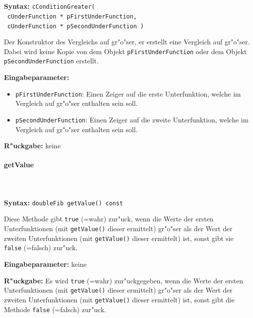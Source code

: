\ \\\\\noindent
\textbf{Syntax:} \verb|cConditionGreater(| \\\verb| cUnderFunction * pFirstUnderFunction,| \\\verb| cUnderFunction * pSecondUnderFunction )|

\bigskip\noindent
Der Konstruktor des Vergleichs auf gr"o"ser, er erstellt eine Vergleich auf gr"o"ser. Dabei wird keine Kopie von dem Objekt \verb|pFirstUnderFunction| oder dem Objekt \verb|pSecondUnderFunction| erstellt.

\bigskip\noindent
\textbf{Eingabeparameter:}
\begin{itemize}
 \item \verb|pFirstUnderFunction|: Einen Zeiger auf die erste Unterfunktion, welche im Vergleich auf gr"o"ser enthalten sein soll.
 \item \verb|pSecondUnderFunction|: Einen Zeiger auf die zweite Unterfunktion, welche im Vergleich auf gr"o"ser enthalten sein soll.
\end{itemize}

\bigskip\noindent
\textbf{R"uckgabe:} keine


\paragraph{getValue}

\ \\\\\noindent
\textbf{Syntax:} \verb|doubleFib getValue() const|

\bigskip\noindent
Diese Methode gibt \verb|true| (=wahr) zur"uck, wenn die Werte der ersten Unterfunktionen (mit \verb|getValue()| dieser ermittelt) gr"o"ser als der Wert der zweiten Unterfunktionen (mit \verb|getValue()| dieser ermittelt) ist, sonst gibt sie \verb|false| (=falsch) zur"uck.

\bigskip\noindent
\textbf{Eingabeparameter:} keine

\bigskip\noindent
\textbf{R"uckgabe:} Es wird \verb|true| (=wahr) zur"uckgegeben, wenn die Werte der ersten Unterfunktionen (mit \verb|getValue()| dieser ermittelt) gr"o"ser als der Wert der zweiten Unterfunktionen (mit \verb|getValue()| dieser ermittelt) ist, sonst gibt die Methode \verb|false| (=falsch) zur"uck.
























